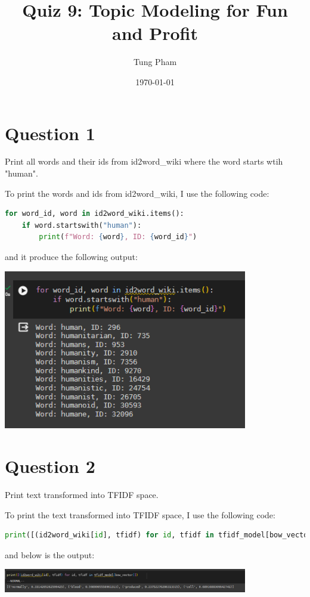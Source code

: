 \documentclass[a4paper]{article}
\title{Quiz 9: Topic Modeling for Fun and Profit}
\author{Tung Pham}
\date{\today}
\begin{document}
\maketitle
\section{Question 1}
Print all words and their ids from id2word\_wiki where the word starts wtih
"human".

To print the words and ids from id2word\_wiki, I use the following code:
\begin{lstlisting}[language=python]
for word_id, word in id2word_wiki.items():
    if word.startswith("human"):
        print(f"Word: {word}, ID: {word_id}")
\end{lstlisting}

and it produce the following output:

\includegraphics[width=0.8\textwidth]{../images/Q1.png}

\section{Question 2}
Print text transformed into TFIDF space.

To print the text transformed into TFIDF space, I use the following code:
\begin{lstlisting}[language=python]
print([(id2word_wiki[id], tfidf) for id, tfidf in tfidf_model[bow_vector]])
\end{lstlisting}

and below is the output:

\includegraphics[width=0.8\textwidth]{../images/Q2.png}
\end{document}

